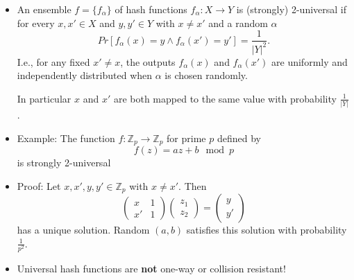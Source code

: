 \documentclass[a4paper]{scrartcl}
\begin{document}
\begin{itemize}
\item An ensemble $f = \{f_\alpha\}$ of hash functions $f_\alpha : X \rightarrow Y$ is (strongly) 2-universal if for every $x, x' \in X$ and $y, y' \in Y$ with $x \neq x'$ and a random $\alpha$
$$Pr[f_\alpha(x) = y \land f_\alpha(x') = y'] = \frac{1}{|Y|^2} .$$
I.e., for any fixed $x' \neq x$, the outputs $f_\alpha(x)$ and $f_\alpha(x')$ are uniformly and independently distributed when $\alpha$ is chosen randomly.

In particular $x$ and $x'$ are both mapped to the same value with probability $\frac{1}{|Y|}$.
\item Example: The function $f: \mathbb{Z}_p \rightarrow \mathbb{Z}_p$ for prime $p$ defined by $$f(z) = az + b \mod p$$ is strongly 2-universal
\item Proof: Let $x, x', y, y' \in \mathbb{Z}_p$ with $x \neq x'$. Then 
$$
\begin{pmatrix}
x & 1 \\
x' & 1
\end{pmatrix}
\begin{pmatrix}
z_1 \\
z_2
\end{pmatrix}
=
\begin{pmatrix}
y \\
y'
\end{pmatrix}
$$
has a unique solution. Random $(a,b)$ satisfies this solution with probability $\frac{1}{p^2}$.
\item Universal hash functions are \textbf{not} one-way or collision resistant!
\end{itemize}
\end{document}
